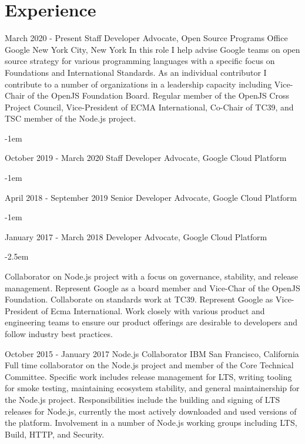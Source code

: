 \documentclass[10pt,a4paper,sans]{moderncv}   %
\begin{document}
\makecvtitle

\section{Experience}

\cventry
  {March 2020 - Present}
  {Staff Developer Advocate, Open Source Programs Office}
  {Google}
  {New York City, New York}{}
  {In this role I help advise Google teams on open source strategy for various programming languages with a specific focus on Foundations and International Standards. As an individual contributor I contribute to a number of organizations in a leadership capacity including Vice-Chair of the OpenJS Foundation Board. Regular member of the OpenJS Cross Project Council, Vice-President of ECMA International, Co-Chair of TC39, and TSC member of the Node.js project.}

\kern-1em

\cventry
  {October 2019 - March 2020}
  {Staff Developer Advocate, Google Cloud Platform}
  {}
  {}{}
  {}

\kern-1em

\cventry
  {April 2018 - September 2019}
  {Senior Developer Advocate, Google Cloud Platform}
  {}
  {}{}
  {}

\kern-1em

\cventry
  {January 2017 - March 2018}
  {Developer Advocate, Google Cloud Platform}
  {}
  {}{}
  {}

\kern-2.5em

\cventry
  {}
  {}
  {}
  {}{}
  {Collaborator on Node.js project with a focus on governance, stability, and release management. Represent Google as a board member and Vice-Char of the OpenJS Foundation. Collaborate on standards work at TC39. Represent Google as Vice-President of Ecma International. Work closely with various product and engineering teams to ensure our product offerings are desirable to developers and follow industry best practices.}

\cventry
  {October 2015 - January 2017}
  {Node.js Collaborator}
  {IBM}
  {San Francisco, California}{}
  {Full time collaborator on the Node.js project and member of the Core Technical Committee. Specific work includes release management for LTS, writing tooling for smoke testing, maintaining ecosystem stability, and general maintainership for the Node.js project.  Responsibilities include the building and signing of LTS releases for Node.js, currently the most actively downloaded and used versions of the platform. Involvement in a number of Node.js working groups including LTS, Build, HTTP, and Security.  }
\end{document}
